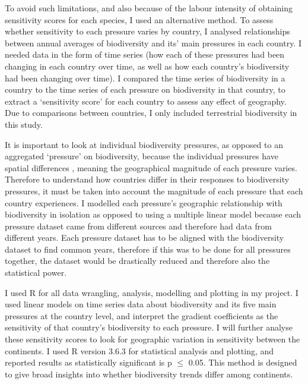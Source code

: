 \documentclass[11pt, a4paper, titlepage]{article}
\begin{document}
	 To avoid such limitations, and also because of the labour intensity of obtaining sensitivity scores for each species, I used an alternative method. To assess whether sensitivity to each pressure varies by country, I analysed relationships between annual averages of biodiversity and its' main pressures in each country. I needed data in the form of time series (how each of these pressures had been changing in each country over time, as well as how each country's biodiversity had been changing over time). I compared the time series of biodiversity in a country to the time series of each pressure on biodiversity in that country, to extract a `sensitivity score' for each country to assess any effect of geography. Due to comparisons between countries, I only included terrestrial biodiversity in this study. 


	It is important to look at individual biodiversity pressures, as opposed to an aggregated `pressure' on biodiversity, because the individual pressures have spatial differences \citep{steffen2015planetary}, meaning the geographical magnitude of each pressure varies. Therefore to understand how countries differ in their responses to biodiversity pressures, it must be taken into account the magnitude of each pressure that each country experiences. I modelled each pressure's geographic relationship with biodiversity in isolation as opposed to using a multiple linear model because each pressure dataset came from different sources and therefore had data from different years. Each pressure dataset has to be aligned with the biodiversity dataset to find common years, therefore if this was to be done for all pressures together, the dataset would be drastically reduced and therefore also the statistical power.
	
	I used R for all data wrangling, analysis, modelling and plotting in my project. I used linear models on time series data about biodiversity and its five main pressures at the country level, and interpret the gradient coefficients as the sensitivity of that country's biodiversity to each pressure. I will further analyse these sensitivity scores to look for geographic variation in sensitivity between the continents. I used R version 3.6.3 for statistical analysis and plotting, and reported results as statistically significant is p $\leq$ 0.05. This method is designed to give broad insights into whether biodiversity trends differ among continents. \newline

\end{document}
